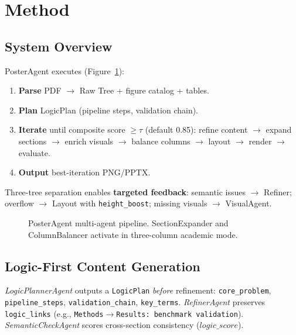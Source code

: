\documentclass{article}
\begin{document}
\section{Method}
\label{sec:method}

\subsection{System Overview}

PosterAgent executes (Figure~\ref{fig:pipeline}):
\begin{enumerate}[leftmargin=*]
  \item \textbf{Parse} PDF $\rightarrow$ Raw Tree + figure catalog + tables.
  \item \textbf{Plan} LogicPlan (pipeline steps, validation chain).
  \item \textbf{Iterate} until composite score $\geq \tau$ (default 0.85):
  refine content $\rightarrow$ expand sections $\rightarrow$ enrich visuals $\rightarrow$ balance columns $\rightarrow$ layout $\rightarrow$ render $\rightarrow$ evaluate.
  \item \textbf{Output} best-iteration PNG/PPTX.
\end{enumerate}

Three-tree separation enables \textbf{targeted feedback}: semantic issues $\rightarrow$ Refiner; overflow $\rightarrow$ Layout with \texttt{height\_boost}; missing visuals $\rightarrow$ VisualAgent.

\begin{figure}[t]
  \centering
  \caption{PosterAgent multi-agent pipeline. SectionExpander and ColumnBalancer activate in three-column academic mode.}
  \label{fig:pipeline}
\end{figure}

\subsection{Logic-First Content Generation}

\emph{LogicPlannerAgent} outputs a \texttt{LogicPlan} \emph{before} refinement: \texttt{core\_problem}, \texttt{pipeline\_steps}, \texttt{validation\_chain}, \texttt{key\_terms}. \emph{RefinerAgent} preserves \texttt{logic\_links} (e.g., \texttt{Methods$\rightarrow$Results: benchmark validation}). \emph{SemanticCheckAgent} scores cross-section consistency ($\mathit{logic\_score}$).
\end{document}
